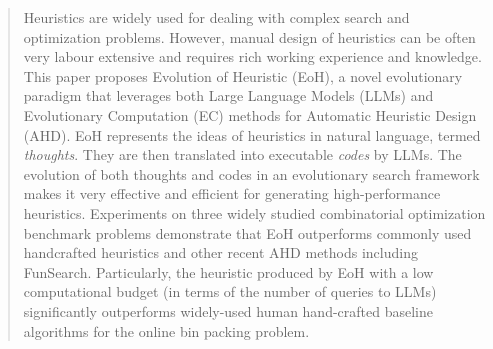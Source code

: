 \begin{abstract}

Heuristics are widely used for dealing with complex search and optimization problems. However, manual design of heuristics can be often very labour extensive and requires rich working experience and knowledge. This paper proposes Evolution of Heuristic (EoH), a novel evolutionary paradigm that leverages both Large Language Models (LLMs) and Evolutionary Computation (EC) methods for Automatic Heuristic Design (AHD). EoH represents the ideas of heuristics in natural language, termed \emph{thoughts}. They are then translated into executable \emph{codes} by LLMs. The evolution of both thoughts and codes in an evolutionary search framework makes it very effective and efficient for generating high-performance heuristics. Experiments on three widely studied combinatorial optimization benchmark problems demonstrate that EoH outperforms commonly used handcrafted heuristics and other recent AHD methods including FunSearch. Particularly, the heuristic produced by EoH with a low computational budget (in terms of the number of queries to LLMs) significantly outperforms widely-used human hand-crafted baseline algorithms for the online bin packing problem.

\end{abstract}